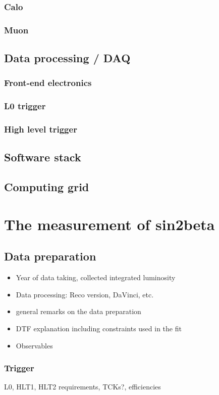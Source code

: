 \subsection{Calo}
\subsection{Muon}
\section{Data processing / DAQ}
\subsection{Front-end electronics}
\subsection{L0 trigger}
\subsection{High level trigger}
\section{Software stack}
\section{Computing grid}

\chapter{The measurement of sin2beta}
\section{Data preparation}
\begin{itemize}
  \item Year of data taking, collected integrated luminosity
  \item Data processing: Reco version, DaVinci, etc.
  \item general remarks on the data preparation
  \item DTF explanation including constraints used in the fit
  \item Observables
\end{itemize}

\subsection{Trigger}
L0, HLT1, HLT2 requirements, TCKs?, efficiencies

